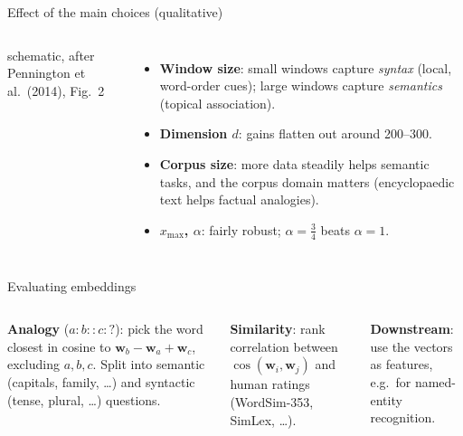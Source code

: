 \documentclass[aspectratio=169,11pt]{beamer}
\newcommand{\wv}{\mathbf{w}}
\begin{document}
\begin{frame}{Effect of the main choices (qualitative)}
\begin{columns}[c]
\centering
{}

{\scriptsize schematic, after Pennington et al.\ (2014), Fig.~2}
\small
\begin{itemize}
  \item \textbf{Window size}: small windows capture \emph{syntax} (local, word-order cues); large windows capture \emph{semantics} (topical association).
  \item \textbf{Dimension $d$}: gains flatten out around 200--300.
  \item \textbf{Corpus size}: more data steadily helps semantic tasks, and the corpus domain matters (encyclopaedic text helps factual analogies).
  \item \textbf{$x_{\max}$, $\alpha$}: fairly robust; $\alpha=\tfrac34$ beats $\alpha=1$.
\end{itemize}
\end{columns}
\end{frame}

\begin{frame}{Evaluating embeddings}
\begin{columns}[c]
\centering
{}
\small
\textbf{Analogy} ($a:b::c:?$): pick the word closest in cosine to $\wv_b-\wv_a+\wv_c$, excluding $a,b,c$.
Split into semantic (capitals, family, \ldots) and syntactic (tense, plural, \ldots) questions.

\vspace{2mm}
\textbf{Similarity}: rank correlation between $\cos(\wv_i,\wv_j)$ and human ratings (WordSim-353, SimLex, \ldots).

\vspace{2mm}
\textbf{Downstream}: use the vectors as features, e.g.\ for named-entity recognition.
\end{columns}
\end{frame}
\end{document}
